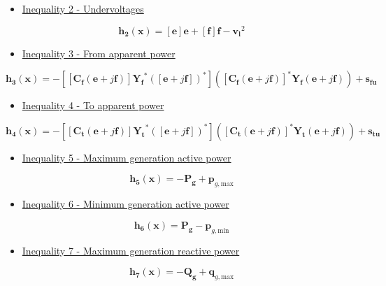 \documentclass{article}
\begin{document}
\begin{itemize}
    \item \underline{Inequality 2 - Undervoltages}
\end{itemize}
\begin{equation}
   \bm{h_2}(\bm{x}) = [\bm{e}]\bm{e} + [\bm{f}]\bm{f} - \bm{v_l}^2
\end{equation}

\begin{itemize}
    \item \underline{Inequality 3 - From apparent power}
\end{itemize}
\begin{equation}
    \bm{h_3}(\bm{x}) = - [[\bm{C_f}(\bm{e} + j\bm{f})]\bm{Y_f}^* ([\bm{e} + j\bm{f}])^*] ([\bm{C_f}(\bm{e} + j\bm{f})]^* \bm{Y_f}(\bm{e} + j\bm{f})) + \bm{s_{fu}}
\end{equation}

\begin{itemize}
    \item \underline{Inequality 4 - To apparent power}
\end{itemize}
\begin{equation}
    \bm{h_4}(\bm{x}) = - [[\bm{C_t}(\bm{e} + j\bm{f})]\bm{Y_t}^* ([\bm{e} + j\bm{f}])^*] ([\bm{C_t}(\bm{e} + j\bm{f})]^* \bm{Y_t}(\bm{e} + j\bm{f})) + \bm{s_{tu}}
\end{equation}

\begin{itemize}
    \item \underline{Inequality 5 - Maximum generation active power}
\end{itemize}
\begin{equation}
    \bm{h_5}(\bm{x}) = - \bm{P_g} + \bm{p}_{g,\text{max}}
\end{equation}

\begin{itemize}
    \item \underline{Inequality 6 - Minimum generation active power}
\end{itemize}
\begin{equation}
    \bm{h_6}(\bm{x}) = \bm{P_g} - \bm{p}_{g,\text{min}}
\end{equation}

\begin{itemize}
    \item \underline{Inequality 7 - Maximum generation reactive power}
\end{itemize}
\begin{equation}
    \bm{h_7}(\bm{x}) = - \bm{Q_g} + \bm{q}_{g,\text{max}}
\end{equation}
\end{document}
